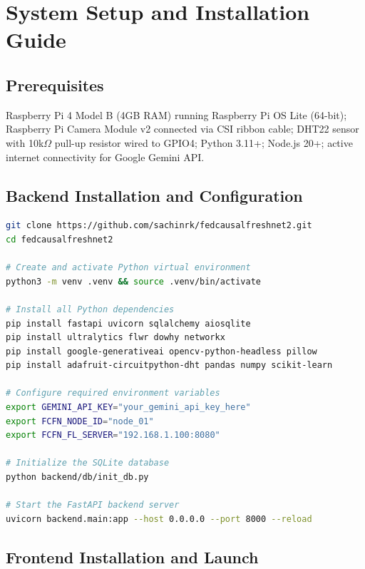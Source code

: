 \documentclass[12pt,a4paper]{report}
\begin{document}
\appendix
{}

\chapter{System Setup and Installation Guide}
\label{app:setup}

\section{Prerequisites}
Raspberry Pi 4 Model B (4GB RAM) running Raspberry Pi OS Lite (64-bit); Raspberry Pi Camera Module v2 connected via CSI ribbon cable; DHT22 sensor with 10k$\Omega$ pull-up resistor wired to GPIO4; Python 3.11+; Node.js 20+; active internet connectivity for Google Gemini API.

\section{Backend Installation and Configuration}

\begin{lstlisting}[language=bash, caption={Backend Setup, Environment Configuration, and Launch}]
git clone https://github.com/sachinrk/fedcausalfreshnet2.git
cd fedcausalfreshnet2

# Create and activate Python virtual environment
python3 -m venv .venv && source .venv/bin/activate

# Install all Python dependencies
pip install fastapi uvicorn sqlalchemy aiosqlite
pip install ultralytics flwr dowhy networkx
pip install google-generativeai opencv-python-headless pillow
pip install adafruit-circuitpython-dht pandas numpy scikit-learn

# Configure required environment variables
export GEMINI_API_KEY="your_gemini_api_key_here"
export FCFN_NODE_ID="node_01"
export FCFN_FL_SERVER="192.168.1.100:8080"

# Initialize the SQLite database
python backend/db/init_db.py

# Start the FastAPI backend server
uvicorn backend.main:app --host 0.0.0.0 --port 8000 --reload
\end{lstlisting}

\section{Frontend Installation and Launch}
\end{document}
